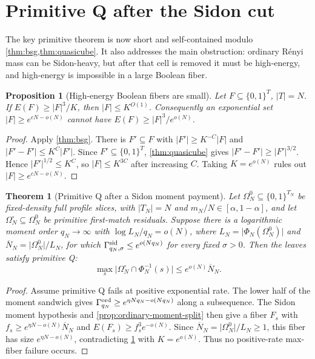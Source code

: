 \documentclass[12pt,a4paper]{amsart}
\numberwithin{equation}{section}
\newtheorem{theorem}{Theorem}[section]
\newtheorem{proposition}[proposition]{Proposition}
\theoremstyle{remark}
\newcommand{\Omc}{\Omega^{\circ}}
\newcommand{\Gord}{\Gamma^{\rm ord}}
\newcommand{\Gsid}{\Gamma^{\rm sid}}
\newcommand{\barN}{\overline N}
\newcommand{\Renyi}{R\'enyi}
\newcommand{\abs}[1]{\lvert #1\rvert}
\begin{document}
\section{Primitive Q after the Sidon cut}\label{sec:primitive-q-proof}

The key primitive theorem is now short and self-contained modulo \cref{thm:bsg,thm:quasicube}.  It also addresses the main obstruction: ordinary \Renyi{} mass can be Sidon-heavy, but after that cell is removed it must be high-energy, and high-energy is impossible in a large Boolean fiber.

\begin{proposition}[High-energy Boolean fibers are small]\label{prop:high-energy-impossible}
Let \(F\subseteq\{0,1\}^T\), \(\abs T=N\).  If
\(E(F)\ge \abs F^3/K\), then \(\abs F\le K^{O(1)}\).  Consequently an
exponential set \(\abs F\ge e^{cN-o(N)}\) cannot have
\(E(F)\ge\abs F^3/e^{o(N)}\).
\end{proposition}

\begin{proof}
Apply \cref{thm:bsg}.  There is \(F'\subseteq F\) with \(\abs{F'}\ge K^{-C}\abs F\) and \(\abs{F'-F'}\le K^C\abs{F'}\).  Since \(F'\subseteq\{0,1\}^T\), \cref{thm:quasicube} gives \(\abs{F'-F'}\ge \abs{F'}^{3/2}\).  Hence \(\abs{F'}^{1/2}\le K^C\), so \(\abs F\le K^{3C}\) after increasing \(C\).  Taking \(K=e^{o(N)}\) rules out \(\abs F\ge e^{cN-o(N)}\).
\end{proof}

\begin{theorem}[Primitive Q after a Sidon moment payment]\label{thm:primitive-q}
Let \(\Omega_N^0\subseteq\{0,1\}^{T_N}\) be fixed-density full profile
slices, with \(\abs{T_N}=N\) and
\(m_N/N\in[\alpha,1-\alpha]\), and let
\(\Omc_N\subseteq\Omega_N^0\) be primitive first-match residuals.  Suppose
there is a logarithmic moment
order \(q_N\to\infty\) with
\(\log L_N/q_N=o(N)\), where
\(L_N=\abs{\Phi_N(\Omega_N^0)}\) and
\(\barN_N=\abs{\Omega_N^0}/L_N\), for which
\(\Gsid_{q_N,\sigma}\le e^{o(Nq_N)}\) for every fixed \(\sigma>0\).
Then the leaves satisfy primitive Q:
\[
        \max_s\abs{\Omc_N\cap\Phi_N^{-1}(s)}
        \le e^{o(N)}\barN_N .
\]
\end{theorem}

\begin{proof}
Assume primitive Q fails at positive exponential rate.  The lower half of
the moment sandwich gives
\(\Gord_{q_N}\ge e^{\eta Nq_N-o(Nq_N)}\) along a subsequence.  The Sidon
moment hypothesis and \cref{prop:ordinary-moment-split} then give a fiber
\(F_s\) with \(f_s\ge e^{\eta N-o(N)}\barN_N\) and
\(E(F_s)\ge f_s^3e^{-o(N)}\).  Since
\(\barN_N=\abs{\Omega_N^0}/L_N\ge1\), this fiber has size
\(e^{\eta N-o(N)}\), contradicting
\cref{prop:high-energy-impossible} with \(K=e^{o(N)}\).  Thus no
positive-rate max-fiber failure occurs.
\end{proof}
\end{document}
